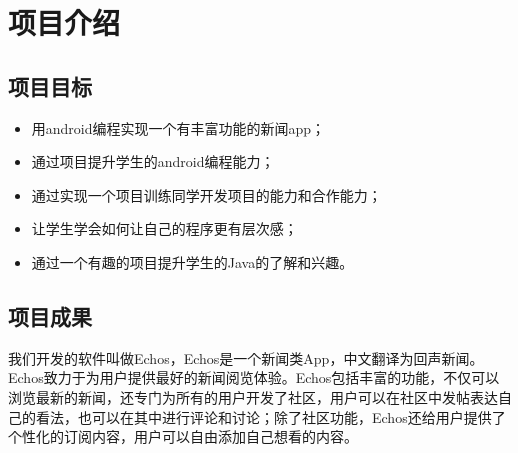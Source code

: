 \section{项目介绍}

\subsection{项目目标}

\begin{itemize}
	\item 用android编程实现一个有丰富功能的新闻app；
	\item 通过项目提升学生的android编程能力；
	\item 通过实现一个项目训练同学开发项目的能力和合作能力；
	\item 让学生学会如何让自己的程序更有层次感；
	\item 通过一个有趣的项目提升学生的Java的了解和兴趣。
\end{itemize}

\subsection{项目成果}

我们开发的软件叫做Echos，Echos是一个新闻类App，中文翻译为回声新闻。Echos致力于为用户提供最好的新闻阅览体验。Echos包括丰富的功能，不仅可以浏览最新的新闻，还专门为所有的用户开发了社区，用户可以在社区中发帖表达自己的看法，也可以在其中进行评论和讨论；除了社区功能，Echos还给用户提供了个性化的订阅内容，用户可以自由添加自己想看的内容。